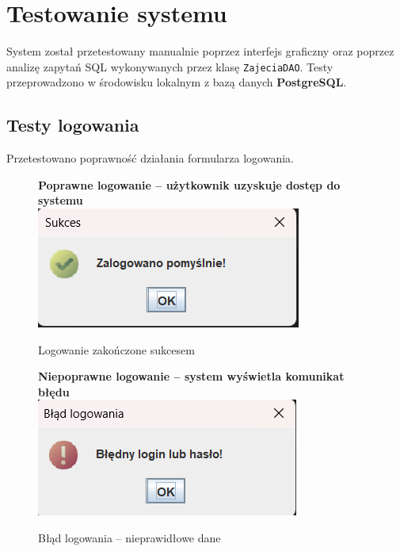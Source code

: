\chapter{Testowanie systemu}

System został przetestowany manualnie poprzez interfejs graficzny oraz poprzez analizę zapytań SQL wykonywanych przez klasę \texttt{ZajeciaDAO}. Testy przeprowadzono w środowisku lokalnym z bazą danych \textbf{PostgreSQL}.

\section{Testy logowania}

Przetestowano poprawność działania formularza logowania.

\begin{figure}[H]
\centering
\begin{minipage}{0.45\textwidth}
\centering
\textbf{Poprawne logowanie – użytkownik uzyskuje dostęp do systemu}\\[0.5em]
\includegraphics[width=\linewidth]{figures/approve/approve_login.png}
\caption{Logowanie zakończone sukcesem}
\label{fig:login-ok}
\end{minipage}
\hfill
\begin{minipage}{0.45\textwidth}
\centering
\textbf{Niepoprawne logowanie – system wyświetla komunikat błędu}\\[0.5em]
\includegraphics[width=\linewidth]{figures/Errors/bad_login.png}
\caption{Błąd logowania – nieprawidłowe dane}
\label{fig:login-fail}
\end{minipage}
\end{figure}

